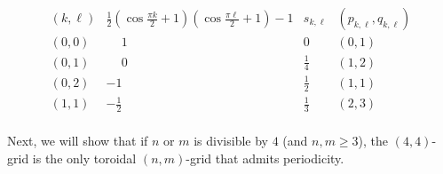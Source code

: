 \documentclass{article}
\numberwithin{equation}{section}
\begin{document}
\begin{table}
\[
\begin{array}{c|c|c|c}
     (k,\ell) &  \frac{1}{2}\left(\cos \frac{\pi k}{2} + 1\right)\left(\cos \frac{\pi \ell}{2} + 1\right) -1 & s_{k,\ell} & (p_{k,\ell},q_{k,\ell}) \\ \hline
     (0,0) & \phantom{-}1 & 0 & (0,1) \\ 
     (0,1) & \phantom{-}0 & \frac{1}{4} & (1,2) \\
     (0,2) & -1 & \frac{1}{2} & (1,1)\\
     (1,1) & -\frac{1}{2} & \frac{1}{3} & (2,3) \\
\end{array}
\]
\caption{For some pairs $k,\ell \in \{0,1,2,3\}$, we give the values of the right-hand side of \eqref{eq:vxf_grid_cos_equation} and the corresponding solutions $s_{k,\ell}$ in the case of $n = m = 4$. These four pairs provide all distinct eigenvalues of the projected transition matrix of the $(4,4)$-grid. Every solution $s_{k,\ell}$ is rational, so there is periodicity. The values for $p_{k,\ell}$ and $q_{k,\ell}$ given in the last column can be used to show that condition (ii) of Theorem \ref{thm:PeakSTchar} does not hold.\label{tab:4_4grid_periodic}}
\end{table}


Next, we will show that if $n$ or $m$ is divisible by $4$ (and $n,m \geq 3$), the $(4,4)$-grid is the only toroidal $(n,m)$-grid that admits periodicity.
\end{document}

